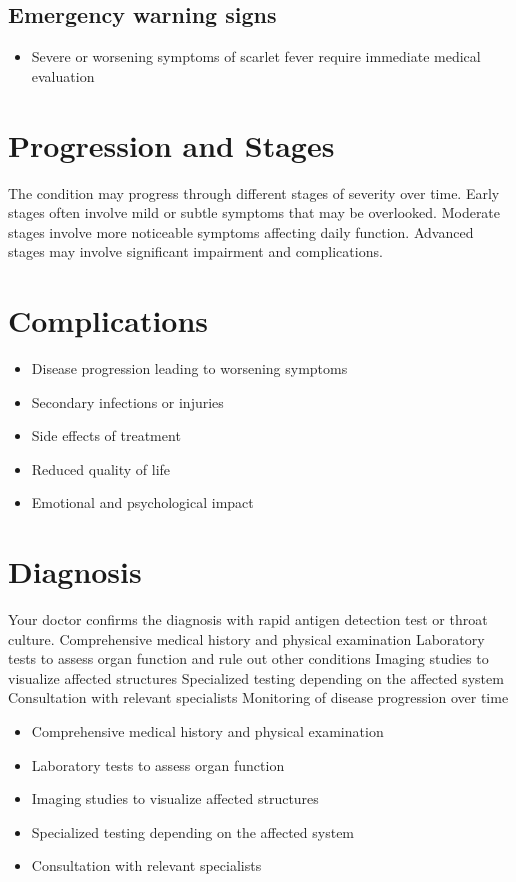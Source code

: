 \subsection{Emergency warning signs}
\begin{itemize}[noitemsep]
  \item Severe or worsening symptoms of scarlet fever require immediate medical evaluation
\end{itemize}
\section{Progression and Stages}
The condition may progress through different stages of severity over time. Early stages often involve mild or subtle symptoms that may be overlooked. Moderate stages involve more noticeable symptoms affecting daily function. Advanced stages may involve significant impairment and complications.
\section{Complications}
\begin{itemize}[noitemsep]
  \item Disease progression leading to worsening symptoms
  \item Secondary infections or injuries
  \item Side effects of treatment
  \item Reduced quality of life
  \item Emotional and psychological impact
\end{itemize}
\section{Diagnosis}
Your doctor confirms the diagnosis with rapid antigen detection test or throat culture. Comprehensive medical history and physical examination Laboratory tests to assess organ function and rule out other conditions Imaging studies to visualize affected structures Specialized testing depending on the affected system Consultation with relevant specialists Monitoring of disease progression over time

\begin{itemize}[noitemsep]
  \item Comprehensive medical history and physical examination
  \item Laboratory tests to assess organ function
  \item Imaging studies to visualize affected structures
  \item Specialized testing depending on the affected system
  \item Consultation with relevant specialists
\end{itemize}
